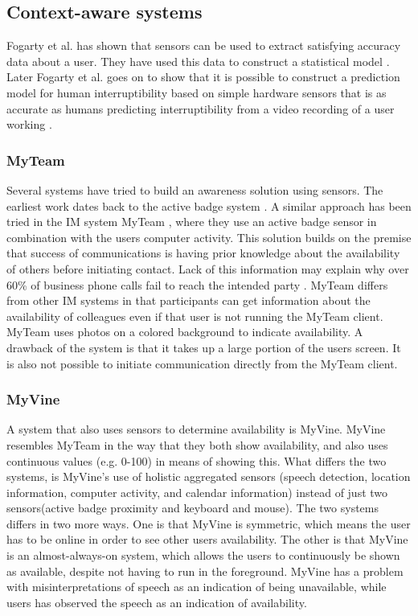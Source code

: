 \documentclass{sigchi}
\begin{document}
\subsection{Context-aware systems}
Fogarty et al. has shown that sensors can be used to extract satisfying accuracy data about a user.
They have used this data to construct a statistical model \cite{fogarty2004examining}.
Later Fogarty et al. goes on to show that it is possible to construct a prediction model for human interruptibility based on simple hardware sensors that is as accurate as humans predicting interruptibility from a video recording of a user working \cite{fogarty2005predicting}.

\subsubsection{MyTeam}
Several systems have tried to build an awareness solution using sensors.
The earliest work dates back to the active badge system \cite{want1992active}.
A similar approach has been tried in the IM system MyTeam \cite{lai2003myteam}, where they use an active badge sensor in combination with the users computer activity.
This solution builds on the premise that success of communications is having prior knowledge about the availability of others before initiating contact.
Lack of this information may explain why over 60\% of business phone calls fail to reach the intended party \cite{whittaker1995rethinking}.
MyTeam differs from other IM systems in that participants can get information about the availability of colleagues even if that user is not running the MyTeam client.
MyTeam uses photos on a colored background to indicate availability.
A drawback of the system is that it takes up a large portion of the users screen. It is also not possible to initiate communication directly from the MyTeam client.

\subsubsection{MyVine}
A system that also uses sensors to determine availability is MyVine\cite{fogarty2004myvine}.
MyVine resembles MyTeam in the way that they both show availability, and also uses continuous values (e.g. 0-100) in means of showing this.
What differs the two systems, is MyVine’s use of holistic aggregated sensors (speech
detection, location information, computer activity, and calendar information) instead of just two sensors(active badge proximity and keyboard and mouse).
The two systems differs in two more ways.
One is that MyVine is symmetric, which means the user has to be online in order to see other users availability.
The other is that MyVine is an almost-always-on system, which allows the users to continuously be shown as available, despite not having to run in the foreground.
MyVine has a problem with misinterpretations of speech as an indication of being unavailable, while users has observed the speech as an indication of availability.
\end{document}
